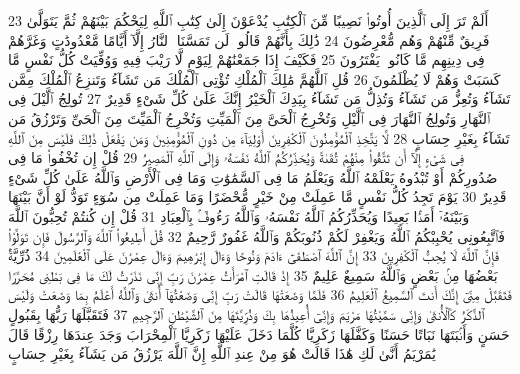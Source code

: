 {\tiny\colorbox{cl_aya}{23}} أَلَمْ تَرَ إِلَى ٱلَّذِينَ أُوتُوا۟ نَصِيبًا مِّنَ ٱلْكِتَٰبِ يُدْعَوْنَ إِلَىٰ كِتَٰبِ ٱللَّهِ لِيَحْكُمَ بَيْنَهُمْ ثُمَّ يَتَوَلَّىٰ فَرِيقٌ مِّنْهُمْ وَهُم مُّعْرِضُونَ
{\tiny\colorbox{cl_aya}{24}} ذَٰلِكَ بِأَنَّهُمْ قَالُوا۟ لَن تَمَسَّنَا ٱلنَّارُ إِلَّآ أَيَّامًا مَّعْدُودَٰتٍ وَغَرَّهُمْ فِى دِينِهِم مَّا كَانُوا۟ يَفْتَرُونَ
{\tiny\colorbox{cl_aya}{25}} فَكَيْفَ إِذَا جَمَعْنَٰهُمْ لِيَوْمٍ لَّا رَيْبَ فِيهِ وَوُفِّيَتْ كُلُّ نَفْسٍ مَّا كَسَبَتْ وَهُمْ لَا يُظْلَمُونَ
{\tiny\colorbox{cl_aya}{26}} قُلِ ٱللَّهُمَّ مَٰلِكَ ٱلْمُلْكِ تُؤْتِى ٱلْمُلْكَ مَن تَشَآءُ وَتَنزِعُ ٱلْمُلْكَ مِمَّن تَشَآءُ وَتُعِزُّ مَن تَشَآءُ وَتُذِلُّ مَن تَشَآءُ بِيَدِكَ ٱلْخَيْرُ إِنَّكَ عَلَىٰ كُلِّ شَىْءٍ قَدِيرٌ
{\tiny\colorbox{cl_aya}{27}} تُولِجُ ٱلَّيْلَ فِى ٱلنَّهَارِ وَتُولِجُ ٱلنَّهَارَ فِى ٱلَّيْلِ وَتُخْرِجُ ٱلْحَىَّ مِنَ ٱلْمَيِّتِ وَتُخْرِجُ ٱلْمَيِّتَ مِنَ ٱلْحَىِّ وَتَرْزُقُ مَن تَشَآءُ بِغَيْرِ حِسَابٍ
{\tiny\colorbox{cl_aya}{28}} لَّا يَتَّخِذِ ٱلْمُؤْمِنُونَ ٱلْكَٰفِرِينَ أَوْلِيَآءَ مِن دُونِ ٱلْمُؤْمِنِينَ وَمَن يَفْعَلْ ذَٰلِكَ فَلَيْسَ مِنَ ٱللَّهِ فِى شَىْءٍ إِلَّآ أَن تَتَّقُوا۟ مِنْهُمْ تُقَىٰةً وَيُحَذِّرُكُمُ ٱللَّهُ نَفْسَهُۥ وَإِلَى ٱللَّهِ ٱلْمَصِيرُ
{\tiny\colorbox{cl_aya}{29}} قُلْ إِن تُخْفُوا۟ مَا فِى صُدُورِكُمْ أَوْ تُبْدُوهُ يَعْلَمْهُ ٱللَّهُ وَيَعْلَمُ مَا فِى ٱلسَّمَٰوَٰتِ وَمَا فِى ٱلْأَرْضِ وَٱللَّهُ عَلَىٰ كُلِّ شَىْءٍ قَدِيرٌ
{\tiny\colorbox{cl_aya}{30}} يَوْمَ تَجِدُ كُلُّ نَفْسٍ مَّا عَمِلَتْ مِنْ خَيْرٍ مُّحْضَرًا وَمَا عَمِلَتْ مِن سُوٓءٍ تَوَدُّ لَوْ أَنَّ بَيْنَهَا وَبَيْنَهُۥٓ أَمَدًۢا بَعِيدًا وَيُحَذِّرُكُمُ ٱللَّهُ نَفْسَهُۥ وَٱللَّهُ رَءُوفٌۢ بِٱلْعِبَادِ
{\tiny\colorbox{cl_aya}{31}} قُلْ إِن كُنتُمْ تُحِبُّونَ ٱللَّهَ فَٱتَّبِعُونِى يُحْبِبْكُمُ ٱللَّهُ وَيَغْفِرْ لَكُمْ ذُنُوبَكُمْ وَٱللَّهُ غَفُورٌ رَّحِيمٌ
{\tiny\colorbox{cl_aya}{32}} قُلْ أَطِيعُوا۟ ٱللَّهَ وَٱلرَّسُولَ فَإِن تَوَلَّوْا۟ فَإِنَّ ٱللَّهَ لَا يُحِبُّ ٱلْكَٰفِرِينَ
{\tiny\colorbox{cl_aya}{33}} إِنَّ ٱللَّهَ ٱصْطَفَىٰٓ ءَادَمَ وَنُوحًا وَءَالَ إِبْرَٰهِيمَ وَءَالَ عِمْرَٰنَ عَلَى ٱلْعَٰلَمِينَ
{\tiny\colorbox{cl_aya}{34}} ذُرِّيَّةًۢ بَعْضُهَا مِنۢ بَعْضٍ وَٱللَّهُ سَمِيعٌ عَلِيمٌ
{\tiny\colorbox{cl_aya}{35}} إِذْ قَالَتِ ٱمْرَأَتُ عِمْرَٰنَ رَبِّ إِنِّى نَذَرْتُ لَكَ مَا فِى بَطْنِى مُحَرَّرًا فَتَقَبَّلْ مِنِّىٓ إِنَّكَ أَنتَ ٱلسَّمِيعُ ٱلْعَلِيمُ
{\tiny\colorbox{cl_aya}{36}} فَلَمَّا وَضَعَتْهَا قَالَتْ رَبِّ إِنِّى وَضَعْتُهَآ أُنثَىٰ وَٱللَّهُ أَعْلَمُ بِمَا وَضَعَتْ وَلَيْسَ ٱلذَّكَرُ كَٱلْأُنثَىٰ وَإِنِّى سَمَّيْتُهَا مَرْيَمَ وَإِنِّىٓ أُعِيذُهَا بِكَ وَذُرِّيَّتَهَا مِنَ ٱلشَّيْطَٰنِ ٱلرَّجِيمِ
{\tiny\colorbox{cl_aya}{37}} فَتَقَبَّلَهَا رَبُّهَا بِقَبُولٍ حَسَنٍ وَأَنۢبَتَهَا نَبَاتًا حَسَنًا وَكَفَّلَهَا زَكَرِيَّا كُلَّمَا دَخَلَ عَلَيْهَا زَكَرِيَّا ٱلْمِحْرَابَ وَجَدَ عِندَهَا رِزْقًا قَالَ يَٰمَرْيَمُ أَنَّىٰ لَكِ هَٰذَا قَالَتْ هُوَ مِنْ عِندِ ٱللَّهِ إِنَّ ٱللَّهَ يَرْزُقُ مَن يَشَآءُ بِغَيْرِ حِسَابٍ
